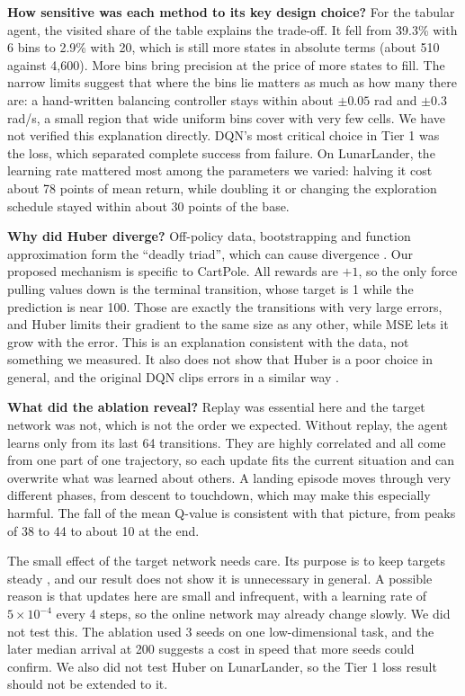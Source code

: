 \documentclass[10pt,twocolumn]{article}
\begin{document}
\textbf{How sensitive was each method to its key design choice?} For the tabular agent, the visited share of the table explains the trade-off. It fell from 39.3\% with 6 bins to 2.9\% with 20, which is still more states in absolute terms (about 510 against 4,600). More bins bring precision at the price of more states to fill. The narrow limits suggest that where the bins lie matters as much as how many there are: a hand-written balancing controller stays within about $\pm0.05$ rad and $\pm0.3$ rad/s, a small region that wide uniform bins cover with very few cells. We have not verified this explanation directly. DQN's most critical choice in Tier 1 was the loss, which separated complete success from failure. On LunarLander, the learning rate mattered most among the parameters we varied: halving it cost about 78 points of mean return, while doubling it or changing the exploration schedule stayed within about 30 points of the base.

\textbf{Why did Huber diverge?} Off-policy data, bootstrapping and function approximation form the ``deadly triad'', which can cause divergence \cite{sutton2018,vanhasselt2018}. Our proposed mechanism is specific to CartPole. All rewards are $+1$, so the only force pulling values down is the terminal transition, whose target is 1 while the prediction is near 100. Those are exactly the transitions with very large errors, and Huber limits their gradient to the same size as any other, while MSE lets it grow with the error. This is an explanation consistent with the data, not something we measured. It also does not show that Huber is a poor choice in general, and the original DQN clips errors in a similar way \cite{mnih2015}.

\textbf{What did the ablation reveal?} Replay was essential here and the target network was not, which is not the order we expected. Without replay, the agent learns only from its last 64 transitions. They are highly correlated and all come from one part of one trajectory, so each update fits the current situation and can overwrite what was learned about others. A landing episode moves through very different phases, from descent to touchdown, which may make this especially harmful. The fall of the mean Q-value is consistent with that picture, from peaks of 38 to 44 to about 10 at the end.

The small effect of the target network needs care. Its purpose is to keep targets steady \cite{mnih2015}, and our result does not show it is unnecessary in general. A possible reason is that updates here are small and infrequent, with a learning rate of $5\times10^{-4}$ every 4 steps, so the online network may already change slowly. We did not test this. The ablation used 3 seeds on one low-dimensional task, and the later median arrival at 200 suggests a cost in speed that more seeds could confirm. We also did not test Huber on LunarLander, so the Tier 1 loss result should not be extended to it.
\end{document}
